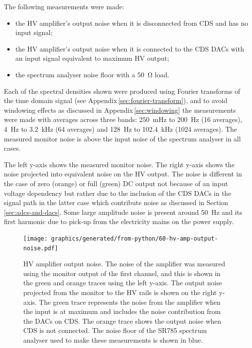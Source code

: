 The following measurements were made:
\begin{itemize}
  \item the \gls{HV} amplifier's output noise when it is disconnected from \gls{CDS} and has no input signal;
  \item the \gls{HV} amplifier's output noise when it is connected to the \gls{CDS} \glspl{DAC} with an input signal equivalent to maximum \gls{HV} output;
  \item the spectrum analyser noise floor with a \SI{50}{\ohm} load.
\end{itemize}
Each of the spectral densities shown were produced using Fourier transforms of the time domain signal (see Appendix\,\ref{sec:fourier-transform}), and to avoid windowing effects as discussed in Appendix\,\ref{sec:windowing} the measurements were made with averages across three bands: \SI{250}{\milli\hertz} to \SI{200}{\hertz} (\num{16} averages), \SI{4}{\hertz} to \SI{3.2}{\kilo\hertz} (\num{64} averages) and \SI{128}{\hertz} to \SI{102.4}{\kilo\hertz} (\num{1024} averages). The measured monitor noise is above the input noise of the spectrum analyser in all cases.

The left y-axis shows the measured monitor noise. The right y-axis shows the noise projected into equivalent noise on the \gls{HV} output. The noise is different in the case of zero (orange) or full (green) \gls{DC} output not because of an input voltage dependency but rather due to the inclusion of the \gls{CDS} \glspl{DAC} in the signal path in the latter case which contribute noise as discussed in Section\,\ref{sec:adcs-and-dacs}. Some large amplitude noise is present around \SI{50}{\hertz} and its first harmonic due to pick-up from the electricity mains on the power supply.

\begin{figure}
  \centering
  \texttt{[image: graphics/generated/from-python/60-hv-amp-output-noise.pdf]}
  \caption[High voltage amplifier output noise]{\gls{HV} amplifier output noise. The noise of the amplifier was measured using the monitor output of the first channel, and this is shown in the green and orange traces using the left y-axis. The output noise projected from the monitor to the \gls{HV} rails is shown on the right y-axis. The green trace represents the noise from the amplifier when the input is at maximum and includes the noise contribution from the \glspl{DAC} on \gls{CDS}. The orange trace shows the output noise when \gls{CDS} is not connected. The noise floor of the SR785 spectrum analyser used to make these measurements is shown in blue.}
  \label{fig:hv-amp-output-noise}
\end{figure}

